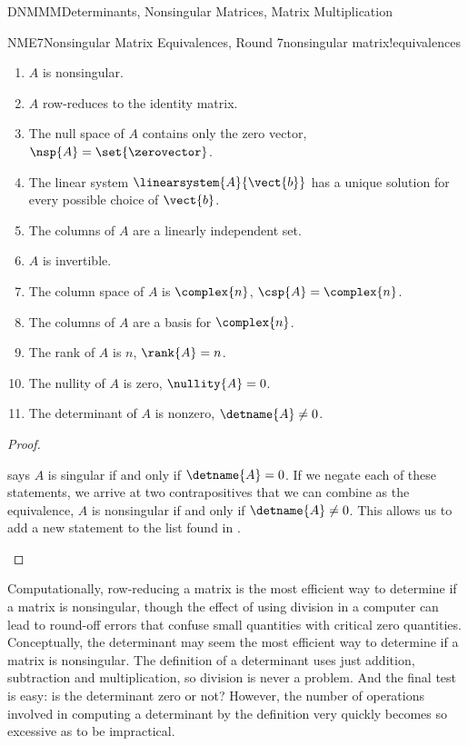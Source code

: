 \begin{subsect}{DNMMM}{Determinants, Nonsingular Matrices, Matrix Multiplication}
\begin{theorem}{NME7}{Nonsingular Matrix Equivalences, Round 7}{nonsingular matrix!equivalences}
\begin{para}
%
\begin{enumerate}
\item $A$ is nonsingular.
\item $A$ row-reduces to the identity matrix.
\item The null space of $A$ contains only the zero vector, $\nsp{A}=\set{\zerovector}$.
\item The linear system $\linearsystem{A}{\vect{b}}$ has a unique solution for every possible choice of $\vect{b}$.
\item The columns of $A$ are a linearly independent set.
\item $A$ is invertible.
\item The column space of $A$ is $\complex{n}$, $\csp{A}=\complex{n}$.
\item The columns of $A$ are a basis for $\complex{n}$.
\item The rank of $A$ is $n$, $\rank{A}=n$.
\item The nullity of $A$ is zero, $\nullity{A}=0$.
\item The determinant of $A$ is nonzero, $\detname{A}\neq 0$.
\end{enumerate}
\end{para}
\end{theorem}
%
\begin{proof}
\begin{para} says $A$ is singular if and only if $\detname{A}=0$.  If we negate each of these statements, we arrive at two contrapositives that we can combine as the equivalence, $A$ is nonsingular if and only if $\detname{A}\neq 0$.  This allows us to add a new statement to the list found in .\end{para}
\end{proof}
%
\begin{para}Computationally, row-reducing a matrix is the most efficient way to  determine if a matrix is nonsingular, though the effect of using division in a computer can lead to round-off errors that confuse small quantities with critical zero quantities.  Conceptually, the determinant may seem the most efficient way to determine if a matrix is nonsingular.  The definition of a determinant uses just addition, subtraction and multiplication, so division is never a problem.  And the final test is easy:  is the determinant zero or not?  However, the number of operations involved in computing a determinant by the definition very quickly becomes so excessive as to be impractical.\end{para}

\end{subsect}
